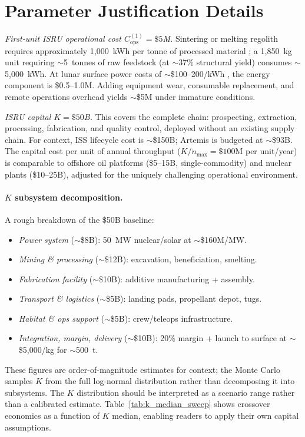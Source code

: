 \documentclass[5p,twocolumn]{elsarticle}
\begin{document}
\section{Parameter Justification Details}
\label{sec:appendix_params}

\emph{First-unit ISRU operational cost $C_{\mathrm{ops}}^{(1)} = \$5$M.} Sintering or melting regolith requires approximately 1{,}000~kWh per tonne of processed material \cite{cilliers2023}; a 1{,}850~kg unit requiring $\sim$5~tonnes of raw feedstock (at $\sim$37\% structural yield) consumes $\sim$5{,}000~kWh. At lunar surface power costs of $\sim$\$100--200/kWh \cite{sanders2015,lsic2021}, the energy component is \$0.5--1.0M. Adding equipment wear, consumable replacement, and remote operations overhead yields $\sim$\$5M under immature conditions.

\emph{ISRU capital $K = \$50$B.} This covers the complete chain: prospecting, extraction, processing, fabrication, and quality control, deployed without an existing supply chain. For context, ISS lifecycle cost is $\sim$\$150B; Artemis is budgeted at $\sim$\$93B. The capital cost per unit of annual throughput ($K/\dot{n}_{\max} = \$100$M per unit/year) is comparable to offshore oil platforms (\$5--15B, single-commodity) and nuclear plants (\$10--25B), adjusted for the uniquely challenging operational environment.

\paragraph{$K$ subsystem decomposition.} A rough breakdown of the \$50B baseline:
\begin{itemize}
  \item \emph{Power system} (${\sim}$\$8B): 50~MW nuclear/solar at ${\sim}$\$160M/MW.
  \item \emph{Mining \& processing} (${\sim}$\$12B): excavation, beneficiation, smelting.
  \item \emph{Fabrication facility} (${\sim}$\$10B): additive manufacturing + assembly.
  \item \emph{Transport \& logistics} (${\sim}$\$5B): landing pads, propellant depot, tugs.
  \item \emph{Habitat \& ops support} (${\sim}$\$5B): crew/teleops infrastructure.
  \item \emph{Integration, margin, delivery} (${\sim}$\$10B): 20\% margin + launch to surface at ${\sim}$\$5{,}000/kg for ${\sim}$500~t.
\end{itemize}
These figures are order-of-magnitude estimates for context; the Monte Carlo samples $K$ from the full log-normal distribution rather than decomposing it into subsystems. The $K$ distribution should be interpreted as a scenario range rather than a calibrated estimate. Table~\ref{tab:k_median_sweep} shows crossover economics as a function of $K$ median, enabling readers to apply their own capital assumptions.
\end{document}
